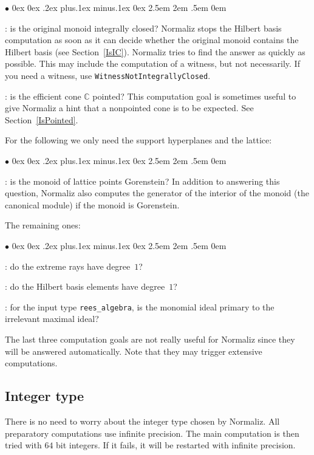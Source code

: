 \documentclass[12pt,a4paper]{scrartcl}
\newcommand{\stdli}{ \topsep0ex \partopsep0ex %
\parsep.2ex plus.1ex minus.1ex \itemsep0ex%
\leftmargin2.5em \labelwidth2em \labelsep.5em \rightmargin0em}%
\renewenvironment{itemize}{\begin{list}{{$\bullet$}}{\stdli}}{\end{list}}
\theoremstyle{definition}
\def\CC{{\mathbb C}}
\def\itemtt[#1]{\item[\textbf{\ttt{#1}}]}
\def\ttt{\texttt}
\begin{document}
\begin{itemize}
	\itemtt[IsIntegrallyClosed, -w]: is the original monoid integrally closed? Normaliz stops the Hilbert basis computation as soon as it can decide whether the original monoid contains the Hilbert basis (see Section~\ref{IsIC}). Normaliz tries to find the answer as quickly as possible. This may include the computation of a witness, but not necessarily. If you need a witness, use \verb|WitnessNotIntegrallyClosed|.
	
	\itemtt[IsPointed]: is the efficient cone $\CC$ pointed? This computation goal is sometimes useful to give Normaliz a hint that a nonpointed cone is to be expected. See Section~\ref{IsPointed}.
\end{itemize}

For the following we only need the support hyperplanes and the lattice:

\begin{itemize}
	\itemtt[IsGorenstein, -G]: is the monoid of lattice points Gorenstein? In addition to answering this question, Normaliz also computes the generator of the interior of the monoid (the canonical module) if the monoid is Gorenstein.
\end{itemize}

The remaining ones:

\begin{itemize}
	
	\itemtt[IsDeg1ExtremeRays]: do the extreme rays have degree~$1$?
	
	\itemtt[IsDeg1HilbertBasis]: do the Hilbert basis elements have degree~$1$?
	
	\itemtt[IsReesPrimary]: for the input type \verb|rees_algebra|, is the monomial ideal primary to the irrelevant maximal ideal?
	
\end{itemize}

The last three computation goals are not really useful for Normaliz since they will be answered automatically. Note that they may trigger extensive computations.

\subsection{Integer type}\label{Integer}

There is no need to worry about the integer type chosen by Normaliz. All preparatory computations use infinite precision. The main computation is then tried with $64$ bit integers. If it fails, it will be restarted with infinite precision.
\end{document}
